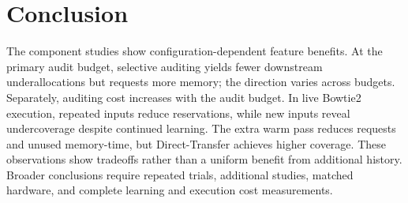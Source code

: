 \section{Conclusion}
\label{sec:conclusion}
The component studies show configuration-dependent feature benefits.
At the primary audit budget, selective auditing yields fewer downstream
underallocations but requests more memory; the direction varies across
budgets. Separately, auditing cost increases with the audit budget.
In live Bowtie2 execution, repeated inputs reduce reservations, while new
inputs reveal undercoverage despite continued learning. The extra warm
pass reduces requests and unused memory-time, but Direct-Transfer achieves
higher coverage. These observations show tradeoffs rather than a uniform
benefit from additional history. Broader conclusions require repeated
trials, additional studies, matched hardware, and complete learning and
execution cost measurements.
